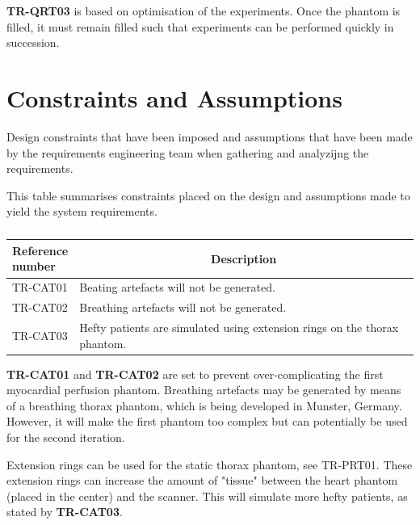 \textbf{TR-QRT03} is based on optimisation of the experiments. Once the phantom is filled, it must remain filled such that experiments can be performed quickly in succession. 

\section{Constraints and Assumptions}
Design constraints that have been imposed and assumptions that have been made by the requirements engineering team when gathering and analyzijng the requirements.

\begin{table}[H]
\caption{}
\label{tab:constassump}
This table summarises constraints placed on the design and assumptions made to yield the system requirements.
\begin{tabular}{l|p{120mm}|}
	\makecell[l]{\textbf{Reference} \\ \textbf{number}} & \multicolumn{1}{c}{\textbf{Description}}\\
	\hline
	TR-CAT01 & Beating artefacts will not be generated. \\
	TR-CAT02 & Breathing artefacts will not be generated. \\
	TR-CAT03 & Hefty patients are simulated using extension rings on the thorax phantom.  \\
	\cline{2-2}
\end{tabular}
\end{table}

\textbf{TR-CAT01} and \textbf{TR-CAT02} are set to prevent over-complicating the first myocardial perfusion phantom. Breathing artefacts may be generated by means of a breathing thorax phantom, which is being developed in Munster, Germany. However, it will make the first phantom too complex but can potentially be used for the second iteration.

Extension rings can be used for the static thorax phantom, see TR-PRT01. These extension rings can increase the amount of "tissue" between the heart phantom (placed in the center) and the scanner. This will simulate more hefty patients, as stated by \textbf{TR-CAT03}.